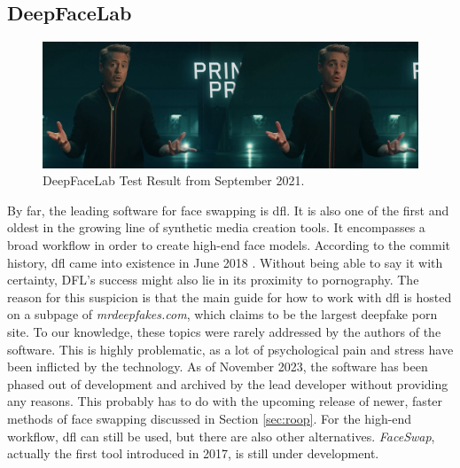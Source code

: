 \documentclass[
  a4paper,  %
  twoside,  %
  bibliography=totoc,
  headsepline,
  cleardoublepage=empty,
  parskip=half,
  draft=false
]{scrbook}
\begin{document}
\subsection{DeepFaceLab}
\begin{figure}[h]
  \centering
  \includegraphics[width=1\textwidth]{./graphics/dfl-demo.png}
  \caption{DeepFaceLab Test Result from September 2021.}
  \label{fig:dfl-sample}
\end{figure}
By far, the leading software for face swapping is \gls{dfl}. It is also one of the first and oldest in the growing line of synthetic media creation tools. It encompasses a broad workflow in order to create high-end face models. According to the commit history, \gls{dfl} came into existence in June 2018 \cite{perovCommitsIperovDeepFaceLab}. Without being able to say it with certainty, DFL's success might also lie in its proximity to pornography. The reason for this suspicion is that the main guide for how to work with \gls{dfl} is hosted on a subpage of \textit{mrdeepfakes.com}, which claims to be the largest deepfake porn site. To our knowledge, these topics were rarely addressed by the authors of the software. This is highly problematic, as a lot of psychological pain and stress have been inflicted by the technology. As of November 2023, the software has been phased out of development and archived by the lead developer without providing any reasons. This probably has to do with the upcoming release of newer, faster methods of face swapping discussed in Section \ref{sec:roop}. For the high-end workflow, \gls{dfl} can still be used, but there are also other alternatives. \textit{FaceSwap}, actually the first tool introduced in 2017, is still under development.
\end{document}
